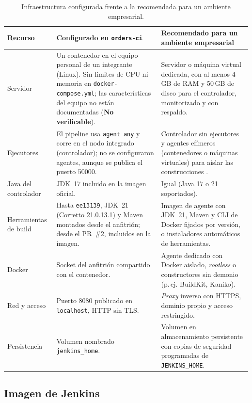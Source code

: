 \documentclass[11pt,a4paper]{article}
\newcommand{\nover}{\textcolor{muted}{\textbf{No verificable}}}
\begin{document}
\begin{table}[H]
\centering
\small
\begin{tabularx}{\textwidth}{@{}P{2.6cm} L L@{}}
\toprule
\textbf{Recurso} & \textbf{Configurado en \texttt{orders-ci}} & \textbf{Recomendado para un ambiente empresarial}\\
\midrule
Servidor & Un contenedor en el equipo personal de un integrante (Linux). Sin límites de CPU ni
memoria en \texttt{docker-compose.yml}; las características del equipo no están documentadas
(\nover). & Servidor o máquina virtual dedicada, con al menos 4\,GB de RAM y 50\,GB de disco para el
controlador, monitorizado y con respaldo.\\
Ejecutores & El pipeline usa \texttt{agent any} y corre en el nodo integrado (controlador); no se
configuraron agentes, aunque se publica el puerto 50000. & Controlador sin ejecutores y agentes
efímeros (contenedores o máquinas virtuales) para aislar las construcciones \cite{jenkins-security}.\\
Java del controlador & JDK~17 incluido en la imagen oficial. & Igual (Java 17 o 21 soportados).\\
Herramientas de build & Hasta \texttt{ee13139}, JDK~21 (Corretto 21.0.13.1) y Maven montados desde el anfitrión; desde el
PR~\#2, incluidos en la imagen. & Imagen de
agente con JDK~21, Maven y CLI de Docker fijados por versión, o instaladores automáticos de
herramientas.\\
Docker & Socket del anfitrión compartido con el contenedor. & Agente dedicado con Docker aislado,
\emph{rootless} o constructores sin demonio (p.\,ej. BuildKit, Kaniko).\\
Red y acceso & Puerto 8080 publicado en \texttt{localhost}, HTTP sin TLS. & \emph{Proxy} inverso con
HTTPS, dominio propio y acceso restringido.\\
Persistencia & Volumen nombrado \texttt{jenkins\_home}. & Volumen en almacenamiento persistente con
copias de seguridad programadas de \texttt{JENKINS\_HOME}.\\
\bottomrule
\end{tabularx}
\caption{Infraestructura configurada frente a la recomendada para un ambiente empresarial.}
\label{tab:infra}
\end{table}

\subsection{Imagen de Jenkins}
\end{document}
